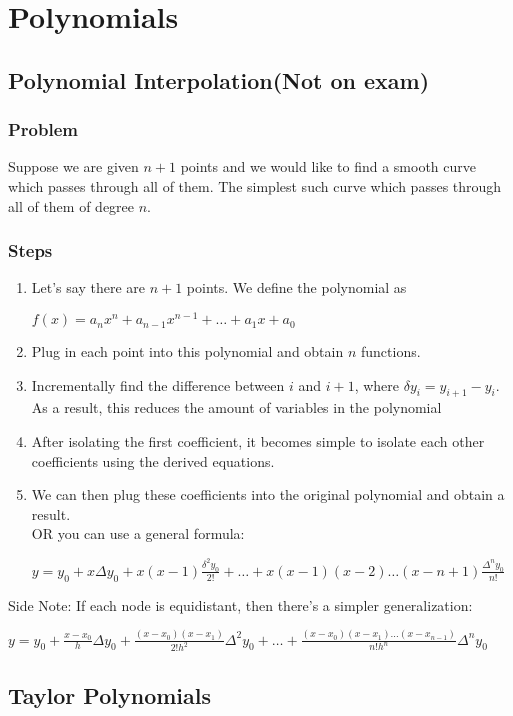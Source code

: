 \documentclass[12pt]{report}
\begin{document}
\chapter{Polynomials}
	\section{Polynomial Interpolation(Not on exam)}
		\subsection{Problem}
			Suppose we are given $n+1$ points and we would like to find a smooth curve which passes through all of them. The simplest such curve which passes through all of them of degree $n$.
		\subsection{Steps}
			\begin{enumerate}
			\item Let's say there are $n+1$ points. We define the polynomial as\\
			\centerline{$f(x) = a_nx^n + a_{n-1}x^{n-1} + \dots + a_1x + a_0$}
			\item Plug in each point into this polynomial and obtain $n$ functions.
			\item Incrementally find the difference between $i$ and $i+1$, where $\delta y_i = y_{i+1} - y_i$. As a result, this reduces the amount of variables in the polynomial
			\item After isolating the first coefficient, it becomes simple to isolate each other coefficients using the derived equations.
			\item We can then plug these coefficients into the original polynomial and obtain a result.\\
			OR you can use a general formula:\\
			\centerline{$ y = y_0 + x\Delta y_0 + x(x-1)\frac{\delta^2 y_0}{2!} + \dots + x(x-1)(x-2)\dots (x-n+1) \frac{\Delta^n y_0}{n!}$}
			\end{enumerate}
			Side Note: If each node is equidistant, then there's a simpler generalization:\\
			\centerline{$y = y_0 + \frac{x-x_0}{h}\Delta y_0 + \frac{(x-x_0)(x-x_1)}{2!h^2}\Delta^2 y_0 + \dots + \frac{(x-x_0)(x-x_1)\dots (x-x_{n-1})}{n!h^n}\Delta^ny_0$}
	\section{Taylor Polynomials}
\end{document}
